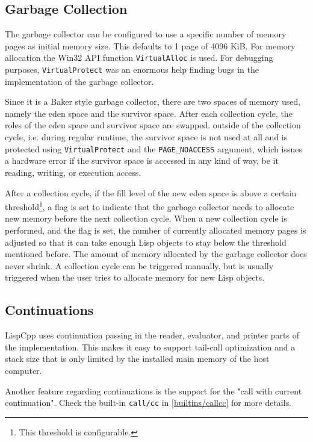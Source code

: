 \documentclass[a4paper]{scrartcl}
\newcommand{\lisp}{Lisp}
\begin{document}
\subsection{Garbage Collection}
\label{gc}
	The garbage collector can be configured to use a specific number of memory pages as initial memory size. This defaults to 1 page of 4096 KiB. For memory allocation the Win32 API function \lstinline|VirtualAlloc| is used. For debugging purposes, \lstinline|VirtualProtect| was an enormous help finding bugs in the implementation of the garbage collector.

	Since it is a Baker style garbage collector, there are two spaces of memory used, namely the eden space and the survivor space. After each collection cycle, the roles of the eden space and survivor space are swapped. outside of the collection cycle, i.e. during regular runtime, the survivor space is not used at all and is protected using \lstinline|VirtualProtect| and the \lstinline|PAGE_NOACCESS| argument, which issues a hardware error if the survivor space is accessed in any kind of way, be it reading, writing, or execution access.

	After a collection cycle, if the fill level of the new eden space is above a certain threshold\footnote{This threshold is configurable.}, a flag is set to indicate that the garbage collector needs to allocate new memory before the next collection cycle. When a new collection cycle is performed, and the flag is set, the number of currently allocated memory pages is adjusted so that it can take enough \lisp{} objects to stay below the threshold mentioned before. The amount of memory allocated by the garbage collector does never shrink. A collection cycle can be triggered manually, but is usually triggered when the user tries to allocate memory for new \lisp{} objects.

\subsection{Continuations}
\label{continuations}
	LispCpp uses continuation passing in the reader, evaluator, and printer parts of the implementation. This makes it easy to support tail-call optimization and a stack size that is only limited by the installed main memory of the host computer.

	Another feature regarding continuations is the support for the "call with current continuation". Check the built-in \lstinline|call/cc| in \ref{builtins/callcc} for more details.
\end{document}
